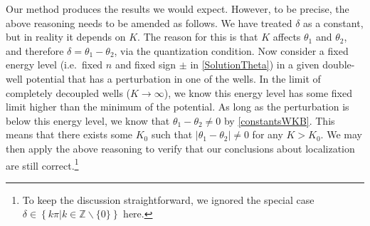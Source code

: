 \documentclass[12pt]{article}
\begin{document}
\noindent Our method produces the results we would expect. 
However, to be precise, the above reasoning needs to be amended as follows.
We have treated $\delta$ as a constant, but in reality it depends on $K$. 
The reason for this is that $K$ affects $\theta_1$ and $\theta_2$, and therefore $\delta=\theta_1-\theta_2$, via the quantization condition. 
Now  consider a fixed energy level (i.e.\ fixed $n$ and fixed sign $\pm$ in \eqref{SolutionTheta}) in a given double-well potential that has a perturbation in one of the wells.
In the limit of completely decoupled wells ($K\rightarrow\infty$), we know this energy level has some fixed limit higher than the minimum of the potential.
As long as the perturbation is below this energy level, we know that $\theta_1-\theta_2\neq 0$ by \eqref{constantsWKB}.
This means that there exists some $K_0$ such that $|\theta_1-\theta_2|\neq0$ for any $K>K_0$.
We may then apply the above reasoning to verify  that our conclusions about localization are still correct.\footnote{
To keep the discussion straightforward, we ignored the special case $\delta\in\left\{k\pi|k\in\mathbb{Z}\backslash\{0\}\right\}$ here.}
\end{document}
